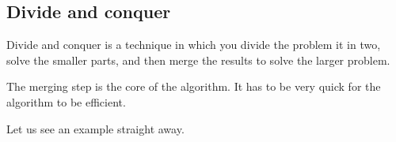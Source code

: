\subsection{Divide and conquer}

Divide and conquer is a technique in which you divide the problem it in two,
solve the smaller parts, and then merge the results
to solve the larger problem.

The merging step is the core of the algorithm.
It has to be very quick for the algorithm to be efficient.

Let us see an example straight away.



